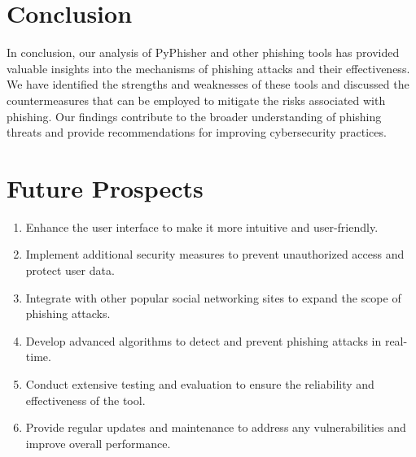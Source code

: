 \documentclass[openany]{report}
\begin{document}
\chapter{Conclusion}

In conclusion, our analysis of PyPhisher and other phishing tools has provided valuable insights into the mechanisms of phishing attacks and their effectiveness. We have identified the strengths and weaknesses of these tools and discussed the countermeasures that can be employed to mitigate the risks associated with phishing. Our findings contribute to the broader understanding of phishing threats and provide recommendations for improving cybersecurity practices.

\chapter{Future Prospects}
\begin{enumerate}
    \item Enhance the user interface to make it more intuitive and user-friendly.
    \item Implement additional security measures to prevent unauthorized access and protect user data.
    \item Integrate with other popular social networking sites to expand the scope of phishing attacks.
    \item Develop advanced algorithms to detect and prevent phishing attacks in real-time.
    \item Conduct extensive testing and evaluation to ensure the reliability and effectiveness of the tool.
    \item Provide regular updates and maintenance to address any vulnerabilities and improve overall performance.
\end{enumerate}
\end{document}

